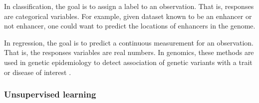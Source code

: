 In classification, the goal is to assign a label to an observation. That is, responses are categorical variables.
For example, given dataset known to be
an enhancer or not enhancer, one could want to predict the locations of enhancers in the genome.

In regression, the goal is to predict a continuous measurement for an observation. That is, the responses variables are real numbers. In genomics, these methods are  used in genetic epidemiology to detect association of genetic variants with a trait or disease of interest \cite{dasgupta2011brief}.




\subsubsection{Unsupervised learning}


